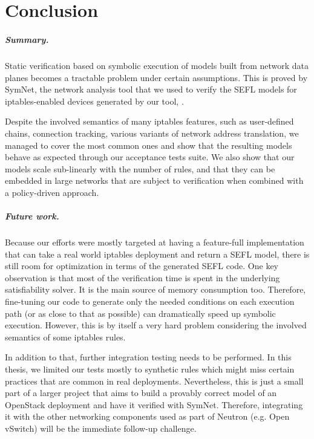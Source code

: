 \chapter{Conclusion}

\paragraph{Summary.} Static verification based on symbolic execution of models
built from network data planes becomes a tractable problem under certain
assumptions.  This is proved by SymNet, the network analysis tool that we used
to verify the SEFL models for iptables-enabled devices generated by our tool,
\TOOL.

Despite the involved semantics of many iptables features, such as user-defined
chains, connection tracking, various variants of network address translation,
we managed to cover the most common ones and show that the resulting models
behave as expected through our acceptance tests suite.  We also show that our
models scale sub-linearly with the number of rules, and that they can be
embedded in large networks that are subject to verification when combined with
a policy-driven approach.

\paragraph{Future work.}
Because our efforts were mostly targeted at having a feature-full
implementation that can take a real world iptables deployment and return a SEFL
model, there is still room for optimization in terms of the generated SEFL
code.  One key observation is that most of the verification time is spent in
the underlying satisfiability solver.  It is the main source of memory
consumption too.  Therefore, fine-tuning our code to generate only the needed
conditions on each execution path (or as close to that as possible) can
dramatically speed up symbolic execution.  However, this is by itself a very
hard problem considering the involved semantics of some iptables rules.

In addition to that, further integration testing needs to be performed.  In
this thesis, we limited our tests mostly to synthetic rules which might miss
certain practices that are common in real deployments.  Nevertheless, this is
just a small part of a larger project that aims to build a provably correct
model of an OpenStack deployment and have it verified with SymNet.  Therefore,
integrating it with the other networking components used as part of Neutron
(e.g. Open vSwitch) will be the immediate follow-up challenge.
